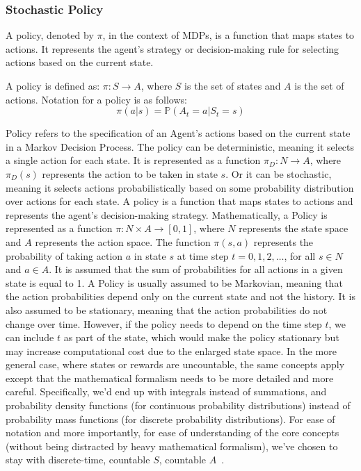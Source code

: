 \documentclass[../xlapes02]{subfiles}
\begin{document}
    \subsubsection{Stochastic Policy}\label{subsubsec:policy}
    A policy, denoted by $\pi$, in the context of MDPs, is a function that maps states to actions. It represents the agent's strategy or decision-making rule for selecting actions based on the current state.
    \begin{definition}
        A policy is defined as: $\pi: S \rightarrow A$, where $S$ is the set of states and $A$ is the set of actions. Notation for a policy is as follows:
        \begin{equation}
            \pi(a|s)=\mathbb{P}(A_t=a|S_t=s)
        \end{equation}
    \end{definition}
    Policy refers to the specification of an Agent's actions based on the current state in a Markov Decision Process. The policy can be deterministic, meaning it selects a single action for each state. It is represented as a function $\pi_D : N \rightarrow A$, where $\pi_D(s)$ represents the action to be taken in state $s$. Or it can be stochastic, meaning it selects actions probabilistically based on some probability distribution over actions for each state. A policy is a function that maps states to actions and represents the agent's decision-making strategy. Mathematically, a Policy is represented as a function $\pi : N \times A \rightarrow [0, 1]$, where $N$ represents the state space and $A$ represents the action space. The function $\pi(s, a)$ represents the probability of taking action $a$ in state $s$ at time step $t = 0, 1, 2, \ldots$, for all $s \in N$ and $a \in A$. It is assumed that the sum of probabilities for all actions in a given state is equal to 1. A Policy is usually assumed to be Markovian, meaning that the action probabilities depend only on the current state and not the history. It is also assumed to be stationary, meaning that the action probabilities do not change over time. However, if the policy needs to depend on the time step $t$, we can include $t$ as part of the state, which would make the policy stationary but may increase computational cost due to the enlarged state space. In the more general case, where states or rewards are uncountable, the same concepts apply except that the mathematical formalism needs to be more detailed and more careful. Specifically, we'd end up with integrals instead of summations, and probability density functions (for continuous probability distributions) instead of probability mass functions (for discrete probability distributions). For ease of notation and more importantly, for ease of understanding of the core concepts (without being distracted by heavy mathematical formalism), we've chosen to stay with discrete-time, countable $S$, countable $A$~\cite{rao2022foundations}.
\end{document}
